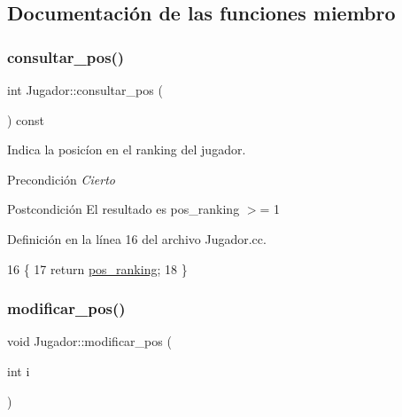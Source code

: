 \subsection{Documentación de las funciones miembro}
\mbox{\label{class_jugador_a69ab40db4a82c1b656895631b9949cbc}} 
\subsubsection{\texorpdfstring{consultar\+\_\+pos()}{consultar\_pos()}}
{\footnotesize\ttfamily int Jugador\+::consultar\+\_\+pos (\begin{DoxyParamCaption}{ }\end{DoxyParamCaption}) const}



Indica la posicíon en el ranking del jugador. 

\begin{DoxyPrecond}{Precondición}
{\itshape Cierto} 
\end{DoxyPrecond}
\begin{DoxyPostcond}{Postcondición}
El resultado es pos\+\_\+ranking $>$= 1 
\end{DoxyPostcond}


Definición en la línea 16 del archivo Jugador.\+cc.


\begin{DoxyCode}
16                                 \{
17     \textcolor{keywordflow}{return} \hyperlink{class_jugador_a200ee7c036d98654af6fab08b8b909e9}{pos\_ranking};
18 \}
\end{DoxyCode}
\mbox{\label{class_jugador_af77bc217af6013d9e57cab34dd03921c}} 
\subsubsection{\texorpdfstring{modificar\+\_\+pos()}{modificar\_pos()}}
{\footnotesize\ttfamily void Jugador\+::modificar\+\_\+pos (\begin{DoxyParamCaption}\item[{int}]{i }\end{DoxyParamCaption})}



